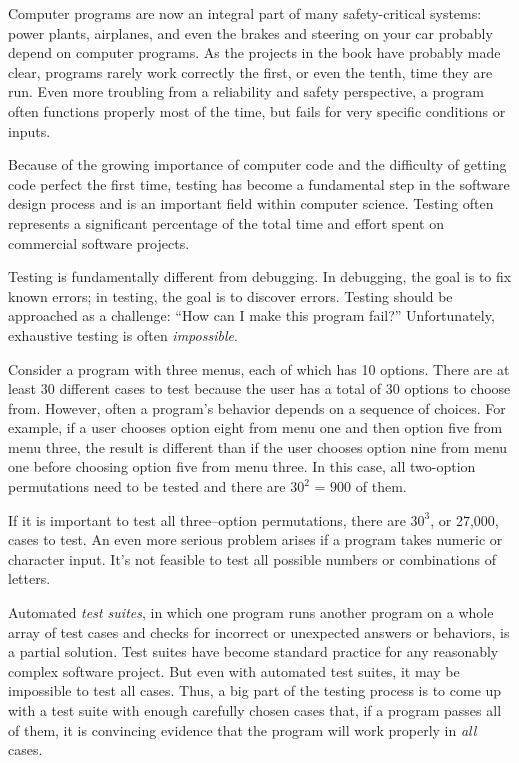 
Computer programs are now an integral part of many safety-critical systems: power plants, airplanes, and even the brakes and steering on your car probably depend on computer programs.  As the projects in the book have probably made clear, programs rarely work correctly the first, or even the tenth, time they are run.  Even more troubling from a reliability and safety perspective, a program often functions properly most of the time, but fails for very specific conditions or inputs.  

Because of the growing importance of computer code and the difficulty of getting code perfect the first time, testing has become a fundamental step in the software design process and is an important field within computer science.  Testing often represents a significant percentage of the total time and effort spent on commercial software projects.

Testing is fundamentally different from debugging.  In debugging, the goal is to fix known errors; in testing, the goal is to discover errors.  Testing should be approached as a challenge: ``How can I make this program fail?'' Unfortunately,  exhaustive testing is often \emph{impossible}. 

 Consider a program with three menus, each of which has 10 options.  There are at least 30 different cases to test because the user has a total of 30 options to choose from.  However, often a program's behavior depends on a sequence of choices.  For example, if a user chooses option eight from menu one and then option five from menu three, the result is different than if the user chooses option nine from menu one before choosing option five from menu three.  In this case, all two-option permutations need to be tested and there are $30^2$ = $900$ of them. 

 If it is important to test all three--option permutations, there are $30^3$, or 27,000, cases to test.   An even more serious problem arises if a program takes numeric or character input.  It's not feasible to test all possible numbers or combinations of letters. 

Automated \emph{test suites}, in which one program runs another program on a whole array of test cases and checks for incorrect or unexpected answers or behaviors, is a partial solution.  Test suites have become standard practice for any reasonably complex software project.  But even with automated test suites, it may be impossible to test all cases.   Thus, a big part of the testing process is to come up with a test suite with enough carefully chosen cases that, if a program passes all of them, it is convincing evidence that the program will work properly in \emph{all} cases.  

